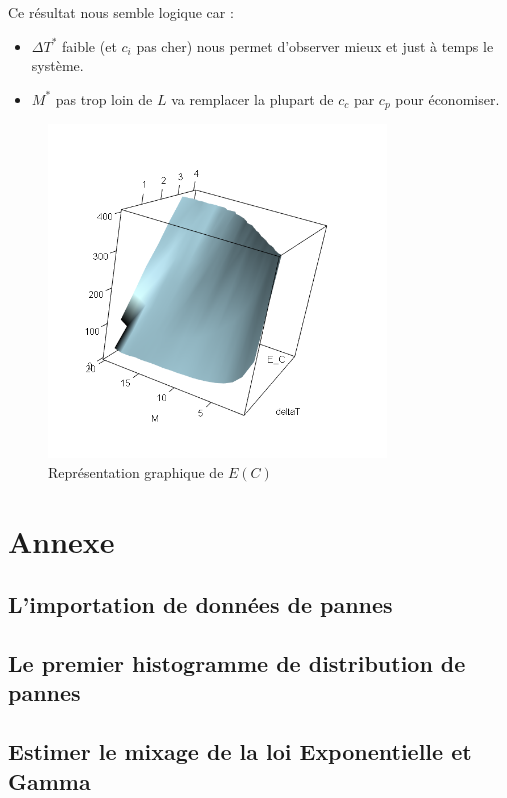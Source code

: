 \documentclass[10pt,a4paper]{article}
\begin{document}
Ce résultat nous semble logique car :
\begin{itemize}
    \item $\Delta T^*$ faible (et $c_i$ pas cher) nous permet d'observer mieux et just à temps le système.
    \item $M^*$ pas trop loin de $L$ va remplacer la plupart de $c_c$ par $c_p$ pour économiser.
\end{itemize}

\begin{figure}
    \centering
    \caption{Représentation graphique de $E(C)$}
    \label{fig:e_c}
    \includegraphics[width=0.8\textwidth]{img/E_C_degrad.png}
\end{figure}

\clearpage
\section{Annexe}
\subsection{L'importation de données de pannes}
\label{annexe:import_pannes}

\subsection{Le premier histogramme de distribution de pannes}
\label{annexe:premier_histo}

\subsection{Estimer le mixage de la loi Exponentielle et Gamma}
\label{annexe:em_exp_gamma}

\end{document}
